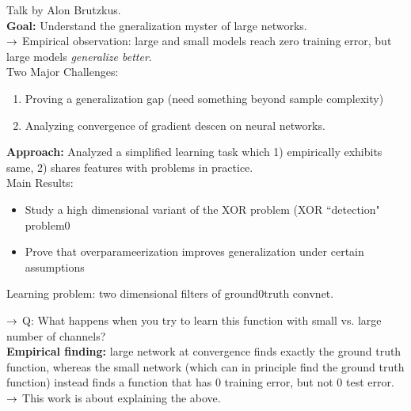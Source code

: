 Talk by Alon Brutzkus. \\

{\bf Goal:} Understand the gneralization myster of large networks. \\

$\rightarrow$ Empirical observation: large and small models reach zero training error, but large models {\it generalize better}. \\

Two Major Challenges:
\begin{enumerate}
    \item Proving a generalization gap (need something beyond sample complexity)
    \item Analyzing convergence of gradient descen on neural networks.
\end{enumerate}

{\bf Approach:} Analyzed a simplified learning task which 1) empirically exhibits same, 2) shares features with problems in practice. \\

Main Results:
\begin{itemize}
    \item Study a high dimensional variant of the XOR problem (XOR ``detection" problem0
    \item Prove that overparameerization improves generalization under certain assumptions
\end{itemize}

Learning problem: two dimensional filters of ground0truth convnet.

$\rightarrow$ Q: What happens when you try to learn this function with small vs. large number of channels? \\

{\bf Empirical finding:} large network at convergence finds exactly the ground truth function, whereas the small network (which can in principle find the ground truth function) instead finds a function that has 0 training error, but not 0 test error. \\

$\rightarrow$ This work is about explaining the above. \\


